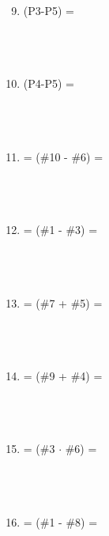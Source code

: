 \documentclass[12pt]{article}
\begin{document}
\begin{minipage}[t]{0.6\textwidth}
    \begin{enumerate}[\#1]
        \setcounter{enumi}{8} %
        \item (P3-P5) =
        \\\\\\\\
        \item (P4-P5) =
        \\\\\\\\
        \item = (\#10 - \#6) =
        \\\\\\\\
        \item = (\#1 - \#3) =
        \\\\\\\\
        \item = (\#7 + \#5) =
        \\\\\\\\
        \item = (\#9 + \#4) =
        \\\\\\\\
        \item = (\#3 $\cdot$ \#6) =
        \\\\\\\\
        \item = (\#1 - \#8) =

    \end{enumerate}
\end{minipage}
\end{document}
